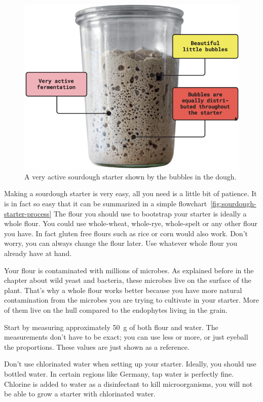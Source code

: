 \begin{figure}[!htb]
  \centering
  \includegraphics[width=\textwidth]{sourdough-starter-activity-indicators}
  \caption[Very active sourdough]{A very active sourdough starter shown by the
      bubbles in the dough.}%
  \label{fig:sourdough-starter}
\end{figure}

Making a sourdough starter is very easy, all you need
is a little bit of patience. It is in fact so easy that it can be summarized
in a simple flowchart~\ref{fig:sourdough-starter-process} The flour you should
use to bootstrap your starter is ideally a whole flour.
You could use whole-wheat, whole-rye, whole-spelt or
any other flour you have. In fact gluten free flours such
as rice or corn would also work. Don't worry, you can always
change the flour later. Use whatever whole flour you
already have at hand.

Your flour is contaminated with millions of microbes. As explained
before in the chapter about wild yeast and bacteria, these
microbes live on the surface of the plant. That's why
a whole flour works better because you have more natural
contamination from the microbes you are trying to cultivate
in your starter. More of them live on the hull compared to the
endophytes living in the grain.

Start by measuring approximately \qty{50}{\gram} of both flour and
water. The measurements don't have to be exact; you can use
less or more, or just eyeball the proportions. These
values are just shown as a reference.

Don't use chlorinated water when setting up your starter.
Ideally, you should use bottled water. In certain regions
like Germany, tap water is perfectly fine. Chlorine is added
to water as a disinfectant to kill microorganisms, you will
not be able to grow a starter with chlorinated water.

